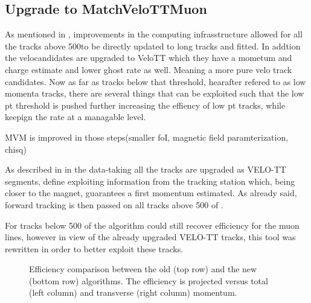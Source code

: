 
\subsection{Upgrade to MatchVeloTTMuon}
\label{sec:matchvelottmuon}
As mentioned in , improvements in the computing infrasstructure allowed for all the tracks
above 500\mev to be directly updated to long tracks and fitted. In addtion the velocandidates are upgraded to
VeloTT which they have a mometum and charge estimate and lower ghost rate as well. Meaning a more pure velo track candidates.
Now as far as tracks below that threshold,
hearafter refered to as low momenta tracks, there are several things that can be exploited such that
the low pt threshold is pushed further increasing the effiency of low pt tracks, while keepign the \hlt rate
at a managable level.

MVM is improved in those steps(smaller foI, magnetic field paramterization, chisq)

As described in \cite{LHCb-PUB-2015-005} in the \runtwo data-taking all the tracks are upgraded as VELO-TT segments, {\color{red} define}
exploiting information from the \ttracker tracking station which, being closer to the magnet,
guarantees a first momentum estimated. As already said, forward tracking is then passed on
all tracks above 500 \mevc of \pt.

For tracks below 500 \mevc of \pt the \mvm algorithm could still recover efficiency for the muon lines,
however in view of the already upgraded VELO-TT tracks, this tool was rewritten in order to better exploit these tracks.


\begin{figure}[h]
  \centering
  \begin{subfigure}{0.5\textwidth}
    \scalebox{.6}{}
    \caption{}
    \label{mvTTm_eff_p}
  \end{subfigure}%
  \hfill%
  \begin{subfigure}{0.5\textwidth}
    \scalebox{.6}{}
    \caption{}
    \label{mvm_eff_p}
  \end{subfigure}
  \caption{Efficiency comparison between the old \mvm (top row) and the new \mvTTm (bottom row) algorithms.
 The efficiency is projected versus total (left column) and transverse (right column) momentum.  }
 \label{mvm_eff_p_comp}
\end{figure}

